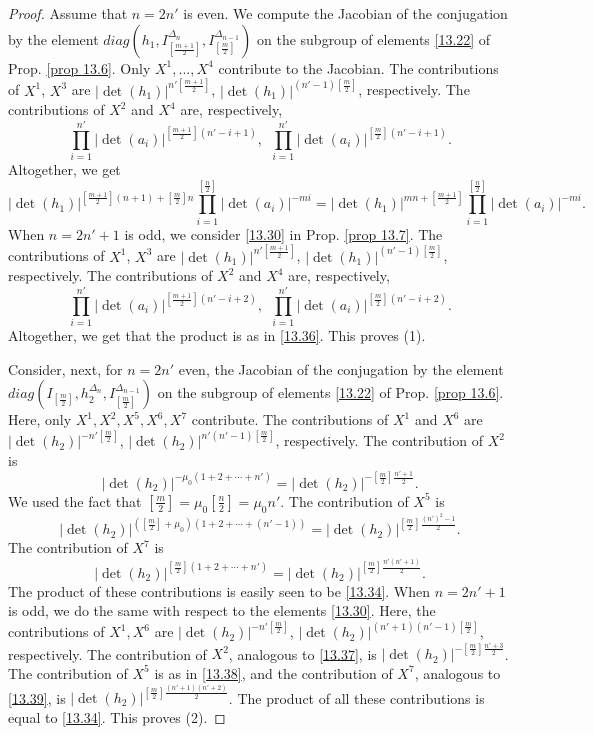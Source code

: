 \documentclass[12pts]{amsart}
\begin{document}
 \begin{proof}
Assume that $n=2n'$ is even. We compute the Jacobian of the conjugation by the element $diag(h_1,I_{[\frac{m+1}{2}]}^{\Delta_n},I_{[\frac{m}{2}]}^{\Delta_{n-1}})$ on the subgroup of elements \eqref{13.22} of Prop. \ref{prop 13.6}. Only $X^1,...,X^4$ contribute to the Jacobian. The contributions of $X^1$, $X^3$ are $|\det(h_1)|^{n'[\frac{m+1}{2}]}$, $|\det(h_1)|^{(n'-1)[\frac{m}{2}]}$, respectively. The contributions of $X^2$ and $X^4$ are, respectively,
$$
\prod_{i=1}^{n'}|\det(a_i)|^{[\frac{m+1}{2}](n'-i+1)},\ \   
\prod_{i=1}^{n'}|\det(a_i)|^{[\frac{m}{2}](n'-i+1)}.
$$
Altogether, we get
\begin{equation}\label{13.36}
|\det(h_1)|^{[\frac{m+1}{2}](n+1)+[\frac{m}{2}]n}\prod_{i=1}^{[\frac{n}{2}]}|\det(a_i)|^{-mi}=
|\det(h_1)|^{mn+[\frac{m+1}{2}]}\prod_{i=1}^{[\frac{n}{2}]}|\det(a_i)|^{-mi}.
\end{equation}
When $n=2n'+1$ is odd, we consider \eqref{13.30} in Prop. \ref{prop 13.7}. The contributions of $X^1$, $X^3$ are $|\det(h_1)|^{n'[\frac{m+1}{2}]}$, $|\det(h_1)|^{(n'-1)[\frac{m}{2}]}$, respectively. The contributions of $X^2$ and $X^4$ are, respectively,
$$
\prod_{i=1}^{n'}|\det(a_i)|^{[\frac{m+1}{2}](n'-i+2)},\ \   
\prod_{i=1}^{n'}|\det(a_i)|^{[\frac{m}{2}](n'-i+2)}.
$$
Altogether, we get that the product is as in \eqref{13.36}. This proves (1).

Consider, next, for $n=2n'$ even, the Jacobian of the conjugation by the element $diag(I_{[\frac{m}{2}]},h_2^{\Delta_n},I_{[\frac{m}{2}]}^{\Delta_{n-1}})$ on the subgroup of elements \eqref{13.22} of Prop. \ref{prop 13.6}. Here, only $X^1, X^2, X^5, X^6, X^7$ contribute. The contributions of $X^1$ and $X^6$ are $|\det(h_2)|^{-n'[\frac{m}{2}]}$, $|\det(h_2)|^{n'(n'-1)[\frac{m}{2}]}$, respectively. The contribution of $X^2$ is
\begin{equation}\label{13.37}
|\det(h_2)|^{-\mu_0(1+2+\cdots+n')}=|\det(h_2)|^{-[\frac{m}{2}]\frac{n'+1}{2}}.
\end{equation}
We used the fact that $[\frac{m}{2}]=\mu_0[\frac{n}{2}]=\mu_0n'$. The contribution of $X^5$ is 
\begin{equation}\label{13.38}
|\det(h_2)|^{([\frac{m}{2}]+\mu_0)(1+2+\cdots+(n'-1))}=|\det(h_2)|^{[\frac{m}{2}]\frac{(n')^2-1}{2}}.
\end{equation}
The contribution of $X^7$ is 
\begin{equation}\label{13.39}
|\det(h_2)|^{[\frac{m}{2}](1+2+\cdots+n')}=|\det(h_2)|^{[\frac{m}{2}]\frac{n'(n'+1)}{2}}.
\end{equation}
The product of these contributions is easily seen to be \eqref{13.34}. When $n=2n'+1$ is odd, we do the same with respect to the elements \eqref{13.30}. Here, the contributions of $X^1, X^6$ are $|\det(h_2)|^{-n'[\frac{m}{2}]}$, $|\det(h_2)|^{(n'+1)(n'-1)[\frac{m}{2}]}$, respectively. The contribution of $X^2$, analogous to \eqref{13.37}, is $|\det(h_2)|^{-[\frac{m}{2}]\frac{n'+3}{2}}$. The contribution of $X^5$ is as in \eqref{13.38}, and the contribution of $X^7$, analogous to \eqref{13.39}, is   
$|\det(h_2)|^{[\frac{m}{2}]\frac{(n'+1)(n'+2)}{2}}$. The product of all these contributions is equal to \eqref{13.34}. This proves (2).


\end{proof}
\end{document}
